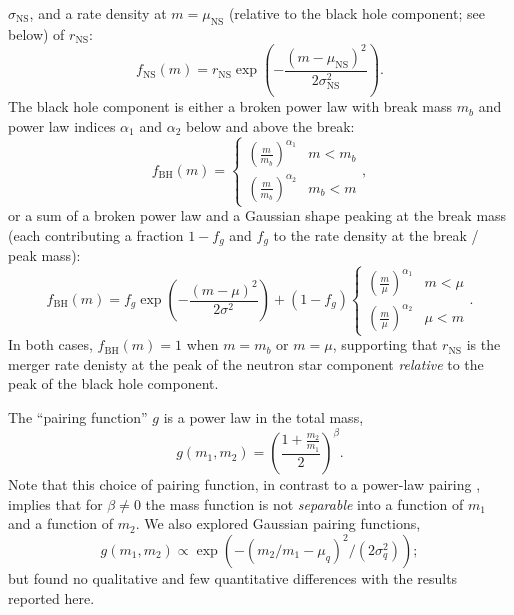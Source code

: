\documentclass[modern]{aastex631}
\begin{document}
$\sigma_\mathrm{NS}$, and a rate density at $m = \mu_\mathrm{NS}$ (relative to
the black hole component; see below) of $r_\mathrm{NS}$:
\begin{equation}
    f_\mathrm{NS}(m) = r_\mathrm{NS} \exp\left( - \frac{\left( m - \mu_\mathrm{NS} \right)^2}{2 \sigma_\mathrm{NS}^2} \right).
\end{equation}
The black hole component is either a broken power law with break mass $m_b$ and
power law indices $\alpha_1$ and $\alpha_2$ below and above the break:
\begin{equation}
    f_\mathrm{BH}(m) = \begin{cases}
        \left( \frac{m}{m_b} \right)^{\alpha_1} & m < m_b \\
        \left( \frac{m}{m_b} \right)^{\alpha_2} & m_b < m
    \end{cases}, 
\end{equation}
or a sum of a broken power law and a Gaussian shape peaking at the break mass
(each contributing a fraction $1-f_g$ and $f_g$ to the rate density at the break
/ peak mass):
\begin{equation}
    f_\mathrm{BH}(m) = f_g \exp\left( - \frac{\left( m - \mu \right)^2}{2 \sigma^2} \right) + \left( 1 - f_g \right) 
    \begin{cases}
        \left( \frac{m}{\mu} \right)^{\alpha_1} & m < \mu \\
        \left( \frac{m}{\mu} \right)^{\alpha_2} & \mu < m
    \end{cases}.
\end{equation}
In both cases, $f_\mathrm{BH}(m) = 1$ when $m = m_b$ or $m = \mu$, supporting
that $r_\mathrm{NS}$ is the merger rate denisty at the peak of the neutron star
component \emph{relative} to the peak of the black hole component.

The ``pairing function'' \citep{Fishbach2020} $g$ is a power law in the total
mass,
\begin{equation}
    g(m_1, m_2) = \left( \frac{1 + \frac{m_2}{m_1}}{2} \right)^{\beta}.
\end{equation}
Note that this choice of pairing function, in contrast to a power-law pairing
\citep{KAGRA:2021duu}, implies that for $\beta \neq 0$ the mass function is not
\emph{separable} into a function of $m_1$ and a function of $m_2$.  We also
explored Gaussian pairing functions,
\begin{equation}
    g\left(m_1, m_2 \right) \propto \exp\left( - \left( m_2/m_1 - \mu_q \right)^2 /
\left( 2 \sigma_q^2 \right) \right);
\end{equation} 
but found no qualitative and few quantitative differences with the results
reported here.
\end{document}
